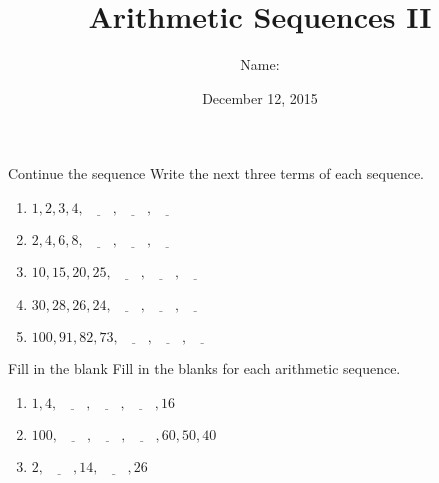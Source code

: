\documentclass[12pt,letterpaper]{article}
\title{Arithmetic Sequences II}
\author{Name: \underline{\hspace{5cm}}}
\date{December 12, 2015}
\begin{document}
\maketitle

\thispagestyle{empty}

\begin{problem}{Continue the sequence}
 Write the next three terms of each sequence.

\begin{enumerate}[\hspace{.5cm}a.]
\item $1, 2, 3, 4, \underline{\hspace{2em}}, \underline{\hspace{2em}},
\underline{\hspace{2em}}$
\item $2, 4, 6, 8, \underline{\hspace{2em}}, \underline{\hspace{2em}},
\underline{\hspace{2em}}$
\item $10, 15, 20, 25, \underline{\hspace{2em}}, \underline{\hspace{2em}},
\underline{\hspace{2em}}$
\item $30, 28, 26, 24, \underline{\hspace{2em}}, \underline{\hspace{2em}},
\underline{\hspace{2em}}$
\item $100, 91, 82, 73, \underline{\hspace{2em}}, \underline{\hspace{2em}},
\underline{\hspace{2em}}$
\end{enumerate}
\end{problem}

\begin{problem}{Fill in the blank}
 Fill in the blanks for each arithmetic sequence.

\begin{enumerate}[\hspace{.5cm}a.]
\item $1, 4, \underline{\hspace{2em}}, \underline{\hspace{2em}},
\underline{\hspace{2em}}, 16$
\item $100, \underline{\hspace{2em}}, \underline{\hspace{2em}},
\underline{\hspace{2em}}, 60, 50, 40$
\item $2, \underline{\hspace{2em}}, 14, \underline{\hspace{2em}}, 26$
\end{enumerate}
\end{problem}
\end{document}
